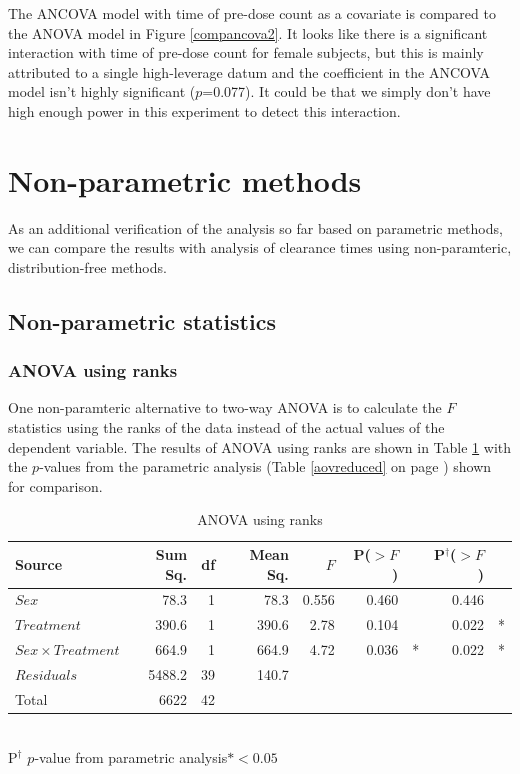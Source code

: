 The ANCOVA model with time of pre-dose count as a covariate is compared to the ANOVA model in Figure \ref{compancova2}. It looks like there is a significant interaction with time of pre-dose count for female subjects, but this is mainly attributed to a single high-leverage datum and the coefficient in the ANCOVA model isn't highly significant ($p$=0.077). It could be that we simply don't have high enough power in this experiment to detect this interaction.

\section{Non-parametric methods}
As an additional verification of the analysis so far based on parametric methods, we can compare the results with analysis of clearance times using non-paramteric, distribution-free methods.
\subsection{Non-parametric statistics}
\subsubsection*{ANOVA using ranks}
One non-paramteric alternative to two-way ANOVA is to calculate the $F$ statistics using the ranks of the data instead of the actual values of the dependent variable\cite{conover}. The results of ANOVA using ranks are shown in Table \ref{aovranks} with the $p$-values from the parametric analysis (Table \ref{aovreduced} on page \pageref{aovreduced}) shown for comparison.
\begin{table}[h]
\centering
\caption{ANOVA using ranks}\label{aovranks}
\begin{tabular}{l|rrrrrl|rl}
Source&Sum Sq.&df&Mean Sq.&$F$&P($>F$)&&P$^{\dag}$($>F$)\\
\hline
$Sex$				& 78.3 & 1 & 78.3 & 0.556 &  0.460 && 0.446& \\
$Treatment$			& 390.6   & 1 & 390.6   & 2.78 & 0.104&  & 0.022&* \\
$Sex\times Treatment$	& 664.9   & 1 & 664.9   & 4.72 & 0.036&*   & 0.022&* \\
$Residuals$			& 5488.2 & 39 & 140.7 &&&&\\
\hline
Total&6622&42&&&&
\end{tabular}\\
P$^{\dag}$ $p$-value from parametric analysis\qquad$*<0.05$
\end{table}

